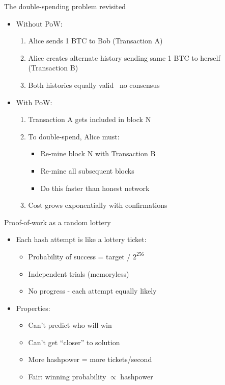 \documentclass[aspectratio=169, lualatex, handout]{beamer}
\begin{document}
\begin{frame}{The double-spending problem revisited}
	\begin{itemize}
		\item Without PoW:
		      \begin{enumerate}
			      \item Alice sends 1 BTC to Bob (Transaction A)
			      \item Alice creates alternate history sending same 1 BTC to herself (Transaction B)
			      \item Both histories equally valid \rightarrow\ no consensus
		      \end{enumerate}
		\item With PoW:
		      \begin{enumerate}
			      \item Transaction A gets included in block N
			      \item To double-spend, Alice must:
			            \begin{itemize}
				            \item Re-mine block N with Transaction B
				            \item Re-mine all subsequent blocks
				            \item Do this faster than honest network
			            \end{itemize}
			      \item Cost grows exponentially with confirmations
		      \end{enumerate}
	\end{itemize}
\end{frame}

\begin{frame}{Proof-of-work as a random lottery}
	\begin{itemize}
		\item Each hash attempt is like a lottery ticket:
		      \begin{itemize}
			      \item Probability of success = target / $2^{256}$
			      \item Independent trials (memoryless)
			      \item No progress - each attempt equally likely
		      \end{itemize}
		\item Properties:
		      \begin{itemize}
			      \item Can't predict who will win
			      \item Can't get ``closer'' to solution
			      \item More hashpower = more tickets/second
			      \item Fair: winning probability $\propto$ hashpower
		      \end{itemize}
	\end{itemize}
\end{frame}
\end{document}

